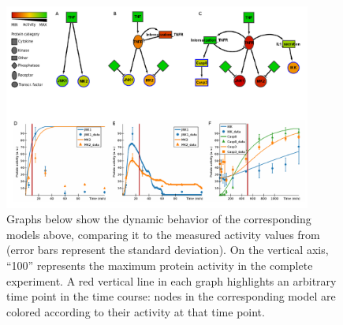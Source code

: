 \documentclass{bmcart}
\begin{document}
\begin{backmatter}
\begin{figure}[h!]
\centering
  \includegraphics[width=0.9\textwidth]{images/small_model_oneImage}
  \caption{
Graphs below show the dynamic behavior of the corresponding models above, comparing it to the measured
activity values from~\cite{pathway-compendium} (error bars represent the standard deviation).
On the vertical axis, ``100'' represents the maximum protein activity in the complete experiment.
A red vertical line in each graph highlights an arbitrary time point in the time course:
nodes in the corresponding model are colored according to their activity at that time point.
}
\end{figure}
\end{backmatter}
\end{document}
